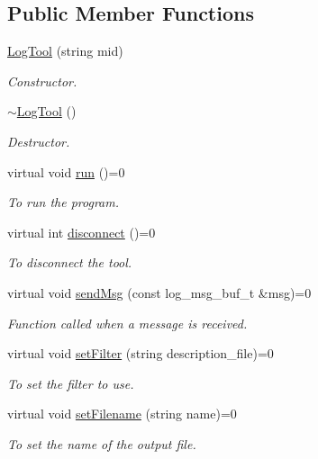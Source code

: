 \subsection*{Public Member Functions}
\begin{DoxyCompactItemize}
\item 
\hyperlink{classLogTool_a74927bb4d3677833aca77b392f727c2d}{LogTool} (string mid)
\begin{DoxyCompactList}\small\item\em Constructor. \item\end{DoxyCompactList}\item 
\hypertarget{classLogTool_afc613143fffe22b6ad9dfdf4f4802d89}{
\hyperlink{classLogTool_afc613143fffe22b6ad9dfdf4f4802d89}{$\sim$LogTool} ()}
\label{classLogTool_afc613143fffe22b6ad9dfdf4f4802d89}

\begin{DoxyCompactList}\small\item\em Destructor. \item\end{DoxyCompactList}\item 
\hypertarget{classLogTool_adbe320ee4774446c04659f0742011481}{
virtual void \hyperlink{classLogTool_adbe320ee4774446c04659f0742011481}{run} ()=0}
\label{classLogTool_adbe320ee4774446c04659f0742011481}

\begin{DoxyCompactList}\small\item\em To run the program. \item\end{DoxyCompactList}\item 
virtual int \hyperlink{classLogTool_a4bf35f0e87500ef2c8679a975c7880a2}{disconnect} ()=0
\begin{DoxyCompactList}\small\item\em To disconnect the tool. \item\end{DoxyCompactList}\item 
virtual void \hyperlink{classLogTool_a46d2c266ef709e801bfd651089312422}{sendMsg} (const log\_\-msg\_\-buf\_\-t \&msg)=0
\begin{DoxyCompactList}\small\item\em Function called when a message is received. \item\end{DoxyCompactList}\item 
virtual void \hyperlink{classLogTool_a10da74570e9bac6082a06c9710612a6c}{setFilter} (string description\_\-file)=0
\begin{DoxyCompactList}\small\item\em To set the filter to use. \item\end{DoxyCompactList}\item 
virtual void \hyperlink{classLogTool_a4cdf12439d3a93fb3c1441a2df2a7235}{setFilename} (string name)=0
\begin{DoxyCompactList}\small\item\em To set the name of the output file. \item\end{DoxyCompactList}\end{DoxyCompactItemize}
